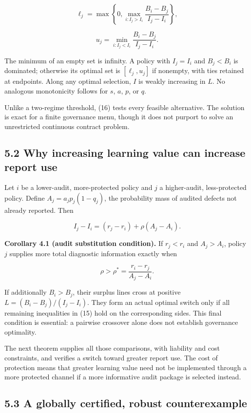 \documentclass[
  11pt,
]{article}
\begin{document}
\[\ell_j=\max\left\{0,\max_{i:I_j>I_i}\frac{B_i-B_j}{I_j-I_i}\right\},\]

\[u_j=\min_{i:I_j<I_i}\frac{B_i-B_j}{I_j-I_i}. \tag{16}\]

The minimum of an empty set is infinity. A policy with \(I_j=I_i\) and
\(B_j<B_i\) is dominated; otherwise its optimal set is \([\ell_j,u_j]\)
if nonempty, with ties retained at endpoints. Along any optimal
selection, \(I\) is weakly increasing in \(L\). No analogous
monotonicity follows for \(s\), \(a\), \(p\), or \(q\).

Unlike a two-regime threshold, (16) tests every feasible alternative.
The solution is exact for a finite governance menu, though it does not
purport to solve an unrestricted continuous contract problem.

\subsection{5.2 Why increasing learning value can increase report
use}\label{why-increasing-learning-value-can-increase-report-use}

Let \(i\) be a lower-audit, more-protected policy and \(j\) a
higher-audit, less-protected policy. Define \(A_j=a_jp_j(1-q_j)\), the
probability mass of audited defects not already reported. Then

\[I_j-I_i=(r_j-r_i)+\rho(A_j-A_i). \tag{17}\]

\textbf{Corollary 4.1 (audit substitution condition).} If \(r_j<r_i\)
and \(A_j>A_i\), policy \(j\) supplies more total diagnostic information
exactly when

\[\rho>\rho^*=\frac{r_i-r_j}{A_j-A_i}. \tag{18}\]

If additionally \(B_i>B_j\), their surplus lines cross at positive
\(L=(B_i-B_j)/(I_j-I_i)\). They form an actual optimal switch only if
all remaining inequalities in (15) hold on the corresponding sides. This
final condition is essential: a pairwise crossover alone does not
establish governance optimality.

The next theorem supplies all those comparisons, with liability and cost
constraints, and verifies a switch toward greater report use. The cost
of protection means that greater learning value need not be implemented
through a more protected channel if a more informative audit package is
selected instead.

\subsection{5.3 A globally certified, robust
counterexample}\label{a-globally-certified-robust-counterexample}
\end{document}
